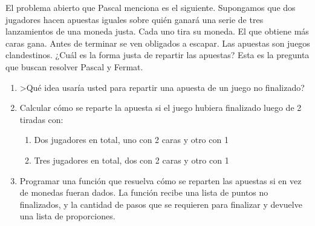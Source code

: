 \documentclass[a4paper,10pt]{article}
\begin{document}
El problema abierto que Pascal menciona es el siguiente.
Supongamos que dos jugadores hacen apuestas iguales sobre quién ganará una serie de tres lanzamientos de una moneda justa.
Cada uno tira su moneda.
El que obtiene más caras gana.
Antes de terminar se ven obligados a escapar.
Las apuestas son juegos clandestinos.
¿Cuál es la forma justa de repartir las apuestas?
Esta es la pregunta que buscan resolver Pascal y Fermat.

\begin{enumerate}[resume]
 \item >Qué idea usaría usted para repartir una apuesta de un juego no finalizado?
 \item Calcular cómo se reparte la apuesta si el juego hubiera finalizado luego de 2 tiradas con:
 \begin{enumerate}
  \item Dos jugadores en total, uno con 2 caras y otro con 1
  \item Tres jugadores en total, dos con 2 caras y otro con 1
 \end{enumerate}
 \item Programar una función que resuelva cómo se reparten las apuestas si en vez de monedas fueran dados.
 La función recibe una lista de puntos no finalizados, y la cantidad de pasos que se requieren para finalizar y devuelve una lista de proporciones.
\end{enumerate}
\end{document}
